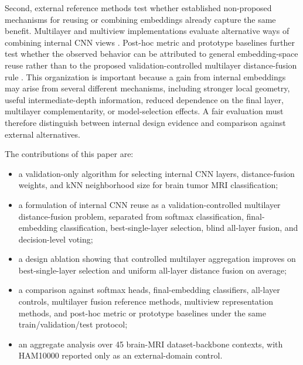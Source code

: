 \documentclass[main.tex]{subfiles}
\begin{document}
Second, external reference methods test whether established non-proposed mechanisms for reusing or combining embeddings already capture the same benefit. Multilayer and multiview implementations evaluate alternative ways of combining internal CNN views \cite{fradi2021multilayer,gomes2023fmlf,evci2022head2toe,aiolli2015easymkl,carroll1968gca,kettenring1971canonical,sharma2012gma,kan2016mvda}. Post-hoc metric and prototype baselines further test whether the observed behavior can be attributed to general embedding-space reuse rather than to the proposed validation-controlled multilayer distance-fusion rule \cite{goldberger2004nca,gautam2024kmex,boubekki2026posthoc}. This organization is important because a gain from internal embeddings may arise from several different mechanisms, including stronger local geometry, useful intermediate-depth information, reduced dependence on the final layer, multilayer complementarity, or model-selection effects. A fair evaluation must therefore distinguish between internal design evidence and comparison against external alternatives.

The contributions of this paper are:
\begin{itemize}
\item a validation-only algorithm for selecting internal CNN layers, distance-fusion weights, and kNN neighborhood size for brain tumor MRI classification;
\item a formulation of internal CNN reuse as a validation-controlled multilayer distance-fusion problem, separated from softmax classification, final-embedding classification, best-single-layer selection, blind all-layer fusion, and decision-level voting;
\item a design ablation showing that controlled multilayer aggregation improves on best-single-layer selection and uniform all-layer distance fusion on average;
\item a comparison against softmax heads, final-embedding classifiers, all-layer controls, multilayer fusion reference methods, multiview representation methods, and post-hoc metric or prototype baselines under the same train/validation/test protocol;
\item an aggregate analysis over 45 brain-MRI dataset-backbone contexts, with HAM10000 reported only as an external-domain control.
\end{itemize}
\end{document}
